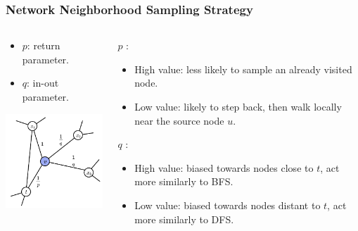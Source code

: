 \documentclass[notes, 10pt, aspectratio=169]{beamer}
\begin{document}
\begin{frame}
    \frametitle{Network Neighborhood Sampling Strategy}
    \begin{columns}
        \begin{column}{0.5\textwidth}
            \begin{itemize}
                \item[] $p$: return parameter.
                \item[] $q$: in-out parameter.
            \end{itemize}
            \begin{center}
                \includegraphics[width=5cm]{./graphics/biasrandomwalk.png}
            \end{center}
        \end{column}
        \begin{column}{0.5\textwidth}
            $p$ :
            \begin{itemize}
                \item High value: less likely to sample
an already visited node.
                \item Low value: likely to step back, then walk locally near the source node $u$.
            \end{itemize}
            $q$ :
            \begin{itemize}
                \item High value: biased towards nodes close to $t$, act more similarly to BFS.
                \item Low value: biased towards nodes distant to $t$, act more similarly to DFS.
            \end{itemize}
        \end{column}
    \end{columns}
\end{frame}
\end{document}
